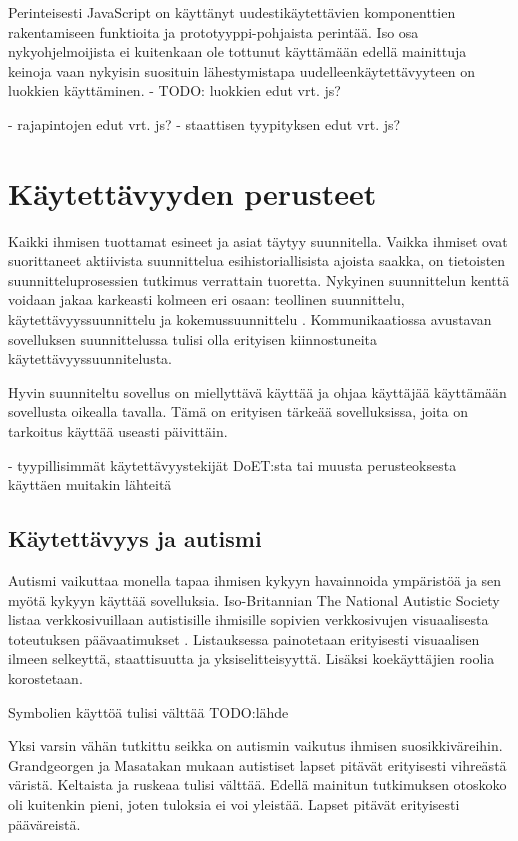 \documentclass[utf8]{gradu3}
\begin{document}
Perinteisesti JavaScript on käyttänyt uudestikäytettävien komponenttien rakentamiseen funktioita ja prototyyppi-pohjaista perintää. Iso osa nykyohjelmoijista ei kuitenkaan ole tottunut käyttämään edellä mainittuja keinoja vaan nykyisin suosituin lähestymistapa uudelleenkäytettävyyteen on luokkien käyttäminen. \parencite[]{typescript-classes}
- TODO: luokkien edut vrt. js?


- rajapintojen edut vrt. js?
- staattisen tyypityksen edut vrt. js?

\section{Käytettävyyden perusteet}

Kaikki ihmisen tuottamat esineet ja asiat täytyy suunnitella. Vaikka ihmiset ovat suorittaneet aktiivista suunnittelua esihistoriallisista ajoista saakka, on tietoisten suunnitteluprosessien tutkimus verrattain tuoretta. Nykyinen suunnittelun kenttä voidaan jakaa karkeasti kolmeen eri osaan: teollinen suunnittelu, käytettävyyssuunnittelu ja kokemussuunnittelu \parencite[]{norman-doet}. Kommunikaatiossa avustavan sovelluksen suunnittelussa tulisi olla erityisen kiinnostuneita käytettävyyssuunnitelusta.

Hyvin suunniteltu sovellus on miellyttävä käyttää ja ohjaa käyttäjää käyttämään sovellusta oikealla tavalla. Tämä on erityisen tärkeää sovelluksissa, joita on tarkoitus käyttää useasti päivittäin.

- tyypillisimmät käytettävyystekijät DoET:sta tai muusta perusteoksesta käyttäen muitakin lähteitä

\subsection{Käytettävyys ja autismi}

Autismi vaikuttaa monella tapaa ihmisen kykyyn havainnoida ympäristöä ja sen myötä kykyyn käyttää sovelluksia. Iso-Britannian The National Autistic Society listaa verkkosivuillaan autistisille ihmisille sopivien verkkosivujen visuaalisesta toteutuksen päävaatimukset \parencite[]{autism-friendly-websites}. Listauksessa painotetaan erityisesti visuaalisen ilmeen selkeyttä, staattisuutta ja yksiselitteisyyttä. Lisäksi koekäyttäjien roolia korostetaan.

Symbolien käyttöä tulisi välttää TODO:lähde

Yksi varsin vähän tutkittu seikka on autismin vaikutus ihmisen suosikkiväreihin. Grandgeorgen ja Masatakan \parencite[]{color-preference-autism} mukaan autistiset lapset pitävät erityisesti vihreästä väristä. Keltaista ja ruskeaa tulisi välttää. Edellä mainitun tutkimuksen otoskoko oli kuitenkin pieni, joten tuloksia ei voi yleistää. Lapset pitävät erityisesti pääväreistä.
\end{document}
